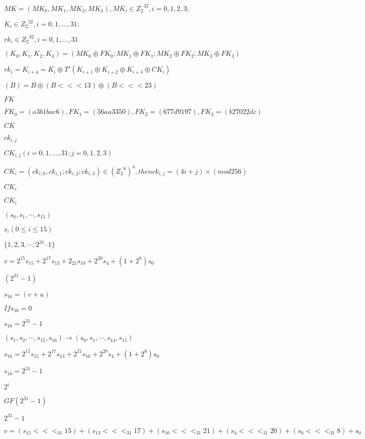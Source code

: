 \documentclass{article}
\begin{document}
$MK = (MK_0,MK_1,MK_2,MK_3), MK_i \in {Z_2}^{32}, i = 0,1,2,3;$
\pagebreak

$K_i \in {Z_2}^{32}, i = 0,1,...,31;$
\pagebreak

$rk_i \in {Z_2}^{32}, i = 0,1,...,31$
\pagebreak

$(K_0,K_1,K_2,K_3) = (MK_0 \oplus FK_0; MK_1 \oplus FK_1; MK_2 \oplus FK_2; MK_3 \oplus FK_3)$
\pagebreak

$rk_i = K_{i+4} = K_i \oplus T\prime(K_{i+1} \oplus K_{i+2} \oplus K_{i+3} \oplus CK_i)$
\pagebreak

$(B) = B \oplus (B <<< 13) \oplus (B <<< 23)$
\pagebreak

$ FK$
\pagebreak

$FK_0 = (a3b1bac6), FK_1 = (56aa3350), FK_2 = (677d9197), FK_3 = (b27022dc)$
\pagebreak

$ CK$
\pagebreak

$ck_{i,j}$
\pagebreak

$CK_{i,j}(i = 0,1,...,31; j = 0,1,2,3)$
\pagebreak

$CK_i = (ck_{i,0}, ck_{i,1}; ck_{i,2}; ck_{i,3}) \in {({Z_2}^{8})}^{4}, then ck_{i,j} = (4i + j) \times (mod 256)$
\pagebreak

$CK_i$
\pagebreak

$ CK_i$
\pagebreak

$ (s_0, s_1,\cdots,s_{15})$
\pagebreak

$ s_i (0 \leq i \leq 15)$
\pagebreak

$ \{1,2,3,\cdots,{2}^{31} – 1\}$
\pagebreak

$ v={2}^{15}s_{15}+{2}^{17}s_{13}+{2}_{21}s_{10}+{2}^{20}s_4+(1+{2}^{8})s_0$
\pagebreak

$ ({2}^{31}-1)$
\pagebreak

$ s_{16}=(v+u)$
\pagebreak

$ If s_{16}=0$
\pagebreak

$s_{16}={2}^{31}-1$
\pagebreak

$ (s_1,s_2,\cdots,s_{15},s_{16})\rightarrow(s_0,s_1,\cdots,s_{14},s_{15})$
\pagebreak

$ s_{16}={2}^{15}s_15+{2}^{17}s_13+{2}^{21}s_10+{2}^{20}s_4+(1+{2}^{8})s_0$
\pagebreak

$ s_{16}={2}^{31}-1$
\pagebreak

$ {2}^{i}$
\pagebreak

$ GF({2}^{31}-1)$
\pagebreak

$ {2}^{31}-1$
\pagebreak

$ v=(s_{15} <<<_{31} 15)+(s_{13} <<<_{31} 17)+(s_{10} <<<_{31} 21)+(s_4 <<<_{31} 20)+(s_0 <<<_{31} 8)+s_0$
\pagebreak
\end{document}
